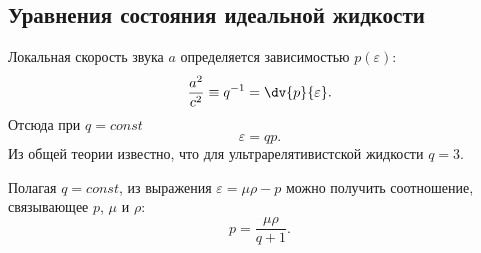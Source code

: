 \documentclass[\docroot/reports/draft/report.tex]{subfiles}
\begin{document}
\subsection{Уравнения состояния идеальной жидкости}

    Локальная скорость звука $a$ определяется зависимостью $p(\varepsilon)$:
    \begin{equation*}
        \frac{a^2}{c^2} \equiv q^{-1} = \dv{p}{\varepsilon} .
    \end{equation*}
    Отсюда при $q = const$
    \begin{equation*}
        \varepsilon = q p .
    \end{equation*}
    Из общей теории известно, что для ультрарелятивистской жидкости $q = 3$.

    Полагая $q = const$, из выражения $\varepsilon = \mu\rho - p$ можно получить соотношение, связывающее $p$, $\mu$ и $\rho$:
    \begin{equation}
        p = \frac{\mu\rho}{q + 1} .
    \end{equation}
\end{document}
